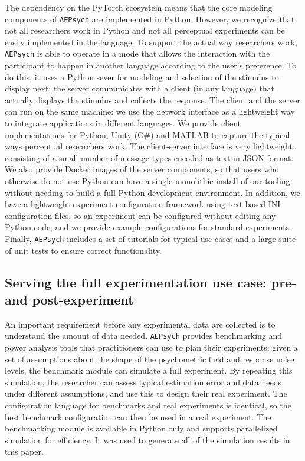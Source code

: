 \documentclass[../main.tex]{subfiles}
\begin{document}
The dependency on the PyTorch ecosystem means that the core modeling components of \texttt{AEPsych} are implemented in Python. However, we recognize that not all researchers work in Python and not all perceptual experiments can be easily implemented in the language. To support the actual way researchers work, \texttt{AEPsych} is able to operate in a mode that allows the interaction with the participant to happen in another language according to the user's preference. To do this, it uses a Python sever for modeling and selection of the stimulus to display next; the server communicates with a client (in any language) that actually displays the stimulus and collects the response. The client and the server can run on the same machine: we use the network interface as a lightweight way to integrate applications in different languages. We provide client implementations for Python, Unity (C\#) and MATLAB to capture the typical ways perceptual researchers work. The client-server interface is very lightweight, consisting of a small number of message types encoded as text in JSON format. We also provide Docker images of the server components, so that users who otherwise do not use Python can have a single monolithic install of our tooling without needing to build a full Python development environment. In addition, we have a lightweight experiment configuration framework using text-based INI configuration files, so an experiment can be configured without editing any Python code, and we provide example configurations for standard experiments. Finally, \texttt{AEPsych} includes a set of tutorials for typical use cases and a large suite of unit tests to ensure correct functionality.

\subsection{Serving the full experimentation use case: pre- and post-experiment}
An important requirement before any experimental data are collected is to understand the amount of data needed. \texttt{AEPsych} provides benchmarking and power analysis tools that practitioners can use to plan their experiments: given a set of assumptions about the shape of the psychometric field and response noise levels, the benchmark module can simulate a full experiment. By repeating this simulation, the researcher can assess typical estimation error and data needs under different assumptions, and use this to design their real experiment. The configuration language for benchmarks and real experiments is identical, so the best benchmark configuration can then be used in a real experiment. The benchmarking module is available in Python only and supports parallelized simulation for efficiency. It was used to generate all of the simulation results in this paper.
\end{document}
